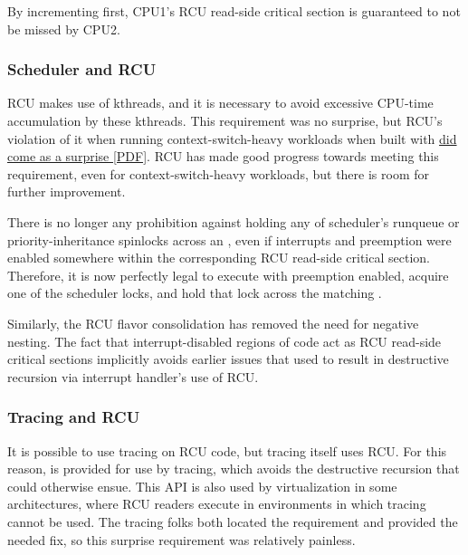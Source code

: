 \begin{tcolorbox}
\end{tcolorbox}

By incrementing  first, CPU1's RCU read-side critical section
is guaranteed to not be missed by CPU2.


\subsubsection{Scheduler and RCU}

RCU makes use of kthreads, and it is necessary to avoid excessive CPU-time
accumulation by these kthreads.
This requirement was no surprise, but
RCU's violation of it when running context-switch-heavy workloads when
built with 
\href{http://www.rdrop.com/users/paulmck/scalability/paper/BareMetal.2015.01.15b.pdf}{did come as a surprise [PDF]}.
RCU has made good progress towards meeting this requirement, even for
context-switch-heavy  workloads, but there is
room for further improvement.

There is no longer any prohibition against holding any of
scheduler's runqueue or priority-inheritance spinlocks across an
, even if interrupts and preemption were enabled
somewhere within the corresponding RCU read-side critical section.
Therefore, it is now perfectly legal to execute 
with preemption enabled, acquire one of the scheduler locks, and hold
that lock across the matching .

Similarly, the RCU flavor consolidation has removed the need for negative
nesting.
The fact that interrupt-disabled regions of code act as RCU
read-side critical sections implicitly avoids earlier issues that used
to result in destructive recursion via interrupt handler's use of RCU\@.


\subsubsection{Tracing and RCU}

It is possible to use tracing on RCU code, but tracing itself uses RCU\@.
For this reason,  is provided for use
by tracing, which avoids the destructive recursion that could otherwise
ensue.
This API is also used by virtualization in some architectures,
where RCU readers execute in environments in which tracing cannot be
used.
The tracing folks both located the requirement and provided the
needed fix, so this surprise requirement was relatively painless.


